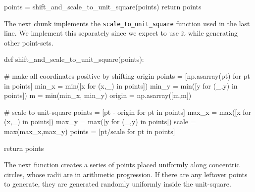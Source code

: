      points = shift_and_scale_to_unit_square(points)
     return points
\nwendcode{}\nwdocspar

The next chunk implements the \verb|scale_to_unit_square| function used 
in the last line. We implement this separately since we expect to use it 
while generating other point-sets. 


\nwenddocs{}\plusendmoddef\nwstartdeflinemarkup{}\nwenddeflinemarkup
def shift_and_scale_to_unit_square(points):
     
     # make all coordinates positive by shifting origin
     points = [np.asarray(pt) for pt in points]
     min_x  = min([x for (x,_) in points])
     min_y  = min([y for (_,y) in points])
     m      = min(min_x, min_y)
     origin = np.asarray([m,m])

     # scale to unit-square
     points = [pt - origin for pt in points]
     max_x  = max([x for (x,_) in points])
     max_y  = max([y for (_,y) in points])
     scale  = max(max_x,max_y)
     points = [pt/scale for pt in points]

     return points
\nwendcode{}\nwdocspar

The next function creates a series of points placed uniformly along concentric circles, whose 
radii are in arithmetic progression. If there are any leftover points to generate, they
are generated randomly uniformly inside the unit-square. 

